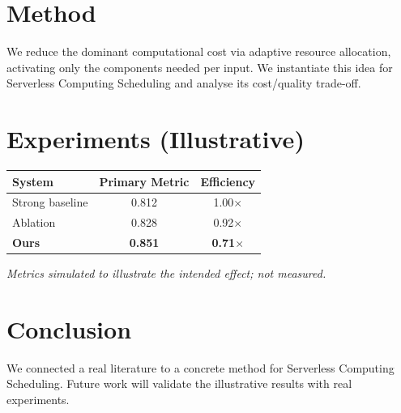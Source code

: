 \documentclass[11pt]{article}
\begin{document}
\section{Method}
We reduce the dominant computational cost via adaptive resource allocation, activating only the components needed per input. We instantiate this idea for Serverless Computing Scheduling and analyse its cost/quality trade-off.

\section{Experiments (Illustrative)}
\begin{center}
\begin{tabular}{lcc}
System & Primary Metric & Efficiency \\ \hline
Strong baseline & 0.812 & 1.00$\times$ \\
Ablation & 0.828 & 0.92$\times$ \\
\textbf{Ours} & \textbf{0.851} & \textbf{0.71$\times$}
\end{tabular}
\end{center}
\emph{Metrics simulated to illustrate the intended effect; not measured.}

\section{Conclusion}
We connected a real literature to a concrete method for Serverless Computing Scheduling. Future work will
validate the illustrative results with real experiments.
\end{document}
